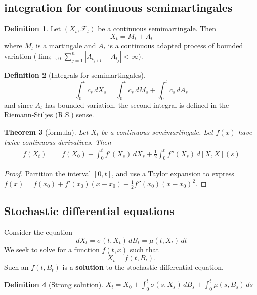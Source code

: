\documentclass[10pt, oneside, reqno]{amsart}
\theoremstyle{plain}%
\newtheorem{thm}{Theorem}[section]
\theoremstyle{definition}
\newtheorem{defn}[thm]{Definition}
\theoremstyle{remark}
\newcommand{\sigf}{\mathcal{F}}
\begin{document}
\subsection{\itos integration for continuous semimartingales} %
\label{sub:itos_integration_for_continuous_semimartingales}
\begin{defn}
	Let $(X_t, \sigf_t)$ be a continuous semimartingale.  Then \[
		X_t = M_t + A_t 
	\] where $M_t$ is a martingale and $A_t$ is a continuous adapted process of bounded variation ($\lim_{\delta \rightarrow 0} \sum_{j=1}^n |A_{t_{j+1}} - A_{t_j} |< \infty$). 
\end{defn}

\begin{defn}[Integrals for semimartingales]
	\[
		\int_0^t c_s \, dX_s = \int_0^t c_s \, dM_s + \int_0^t c_s \, dA_s	
\] and since $A_t$ has bounded variation, the second integral is defined in the Riemann-Stiljes (R.S.) sense.
\end{defn}  

\begin{thm}[\itos formula]
	Let $X_t$ be a continuous semimartingale.  Let $f(x)$ have twice continuous derivatives.  Then \begin{align*}
		f(X_t) &= f(X_0) + \int_0^t f'(X_s) \, dX_s + \frac{1}{2} \int_0^t f''(X_s) \, d[X, X](s)
	\end{align*}
\end{thm}
\begin{proof}
	Partition the interval $[0,t]$, and use a Taylor expansion to express $f(x) = f(x_0) + f'(x_0)(x- x_0) + \frac{1}{2}f''(x_0)(x-x_0)^2$.
\end{proof}  

\subsection{Stochastic differential equations} %
\label{sub:stochastic_differential_equations}
Consider the equation \[
	dX_t = \sigma(t, X_t) \, dB_t = \mu(t, X_t) \, dt
\]  We seek to solve for a function $f(t, x)$ such that \[
	X_t = f(t, B_t).
\]  Such an $f(t, B_t)$ is a \textbf{solution} to the stochastic differential equation.
 
\begin{defn}[Strong solution]
	$X_t = X_0 + \int_0^t \sigma(s, X_s) \, dB_s + \int_0^t \mu(s, B_s) \, ds$
\end{defn}

\end{document}
